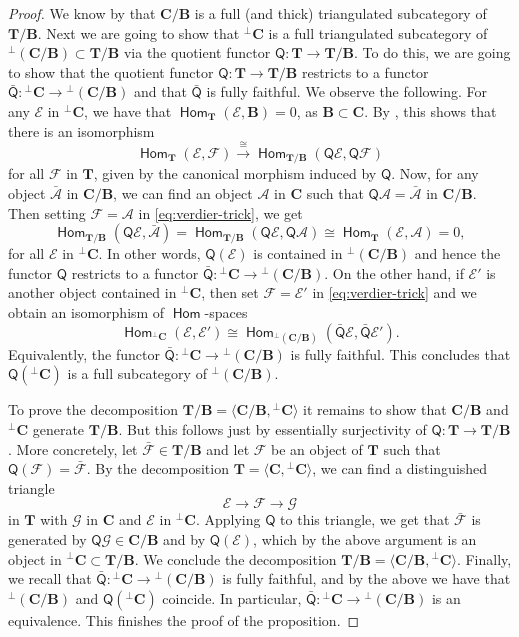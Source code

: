 \documentclass[a4paper,11pt, reqno]{amsart}
\def\BB{\mathbf B}
\def\CC{\mathbf C}
\def\TT{\mathbf T}
\def\sA{\mathscr{A}}
\def\sE{\mathscr{E}}
\def\sF{\mathscr{F}}
\def\sG{\mathscr{G}}
\newcommand{\opname}[1]{\operatorname{\mathsf{#1}}}
\newcommand{\Hom}{\opname{Hom}}
\newcommand{\bQ}{\mathsf{Q}}
\theoremstyle{plain}
\theoremstyle{definition}
\numberwithin{equation}{section}
\newlength{\arrow}
\begin{document}
\begin{proof}
We know by \cite[Corollary 4.3]{verdier} that $\CC / \BB $ is a full (and thick) triangulated subcategory of $\TT / \BB$. 
Next we are going to show that $^{\perp}\CC$ is a full triangulated subcategory of $^{\perp}(\CC / \BB) \subset \TT / \BB$ via the quotient functor $\bQ : \TT \to \TT /  \BB$. 
To do this, we are going to show that the quotient functor $\bQ : \TT \to \TT / \BB$ restricts to a functor $\bar{\bQ} : {^{\perp}\CC} \to {^{\perp}(\CC / \BB)}$ and that $\bar{\bQ}$ is fully faithful.
We observe the following. 
For any $\sE$ in $^{\perp}\CC$, we have that $\Hom_{\TT}( \sE , \BB ) = 0$, as $\BB \subset \CC$. 
By \cite[Proposition 5.3]{verdier}, this shows that there is an isomorphism 
\begin{equation}\label{eq:verdier-trick}
  \Hom_{\TT} ( \sE , \sF ) \xrightarrow{\cong} \Hom_{\TT / \BB }( \bQ \sE  , \bQ \sF  )  
\end{equation}
for all $\sF$ in $\TT$, given by the canonical morphism induced by $\bQ$. 
Now, for any object $\bar{\sA}$ in $\CC  /\BB$, we can find an object $\sA $ in $\CC$ such that $\bQ \sA  = \bar{\sA}$ in  $\CC / \BB$. 
Then setting $\sF = \sA$ in \eqref{eq:verdier-trick}, we get 
\[
  \Hom_{\TT / \BB}( \bQ \sE  , \bar{\sA} ) = \Hom_{\TT / \BB} (\bQ \sE  , \bQ \sA  ) \cong \Hom_{\TT} ( \sE , \sA ) = 0 ,
\]
for all $\sE$ in $^{\perp}\CC$.
In other words, $\bQ( \sE)$ is contained in $^{\perp}( \CC / \BB )$ and hence the functor $\bQ$ restricts to a functor $\bar{\bQ} : {^{\perp}\CC} \to {^{\perp}(\CC / \BB)}$.
On the other hand, if $\sE'$ is another object contained in $^{\perp}\CC$, then set $\sF = \sE'$ in \eqref{eq:verdier-trick} and we obtain an isomorphism of $\Hom$-spaces
\[
\Hom_{^{\perp}\CC} ( \sE , \sE' ) \cong \Hom_{^{\perp} ( \CC / \BB )}( \bar{\bQ} \sE  , \bar{\bQ} \sE'  ) .
\]
Equivalently, the functor $\bar{\bQ} : {^{\perp}\CC} \to {^{\perp}(\CC / \BB)}$ is fully faithful. 
This concludes that $\bQ ( {^{\perp}\CC})$ is a full subcategory of $^{\perp}(\CC / \BB)$.

To prove the decomposition $\TT / \BB = \langle \CC / \BB , {^{\perp}\CC} \rangle$ it remains to show that $\CC / \BB$ and $^{\perp}\CC$ generate $\TT / \BB$. 
But this follows just by essentially surjectivity of $\bQ : \TT \to \TT / \BB$. 
More concretely, let $ \bar{\sF} \in \TT / \BB$ and let $\sF$ be an object of $\TT$ such that $\bQ( \sF ) = \bar{\sF}$. 
By the decomposition $\TT = \langle \CC , {^{\perp}\CC} \rangle$, we can find a distinguished triangle 
\[
\sE \to \sF \to \sG 
\]
in $\TT$ with $\sG$ in $\CC$ and $\sE$ in $^{\perp}\CC$. 
Applying $\bQ$ to this triangle, we get that $\bar{\sF}$ is generated by $\bQ \sG \in \CC / \BB$ and by $\bQ( \sE )$, which by the above argument is an object in $^{\perp}\CC \subset \TT / \BB$. 
We conclude the decomposition $\TT / \BB = \langle \CC / \BB , {^{\perp}\CC} \rangle$.
Finally, we recall that $\bar{\bQ} : {^{\perp}\CC} \to {^{\perp}(\CC / \BB)}$ is fully faithful, and by the above we have that ${^{\perp}(\CC / \BB)} $ and $\bQ ( {^{\perp}\CC} )$ coincide.
In particular, $\bar{\bQ} : {^{\perp}\CC} \to {^{\perp}(\CC / \BB)}$ is an equivalence.
This finishes the proof of the proposition.
\end{proof}
\end{document}
